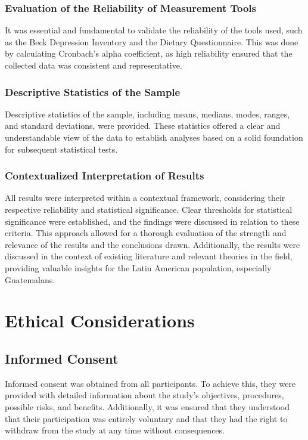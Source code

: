 \documentclass[jou]{apa7}
\begin{document}
\subsubsection{Evaluation of the Reliability of Measurement Tools}
It was essential and fundamental to validate the reliability of the tools used, such as the Beck Depression Inventory and the Dietary Questionnaire. This was done by calculating Cronbach's alpha coefficient, as high reliability ensured that the collected data was consistent and representative.

\subsubsection{Descriptive Statistics of the Sample}
Descriptive statistics of the sample, including means, medians, modes, ranges, and standard deviations, were provided. These statistics offered a clear and understandable view of the data to establish analyses based on a solid foundation for subsequent statistical tests.

\subsubsection{Contextualized Interpretation of Results}
All results were interpreted within a contextual framework, considering their respective reliability and statistical significance. Clear thresholds for statistical significance were established, and the findings were discussed in relation to these criteria. This approach allowed for a thorough evaluation of the strength and relevance of the results and the conclusions drawn. Additionally, the results were discussed in the context of existing literature and relevant theories in the field, providing valuable insights for the Latin American population, especially Guatemalans.


\section{Ethical Considerations}\label{consideraciones-uxe9ticas}

\subsection{Informed Consent}\label{consentimiento-informado}

Informed consent was obtained from all participants. To achieve this, they were provided with detailed information about the study's objectives, procedures, possible risks, and benefits. Additionally, it was ensured that they understood that their participation was entirely voluntary and that they had the right to withdraw from the study at any time without consequences.
\end{document}
